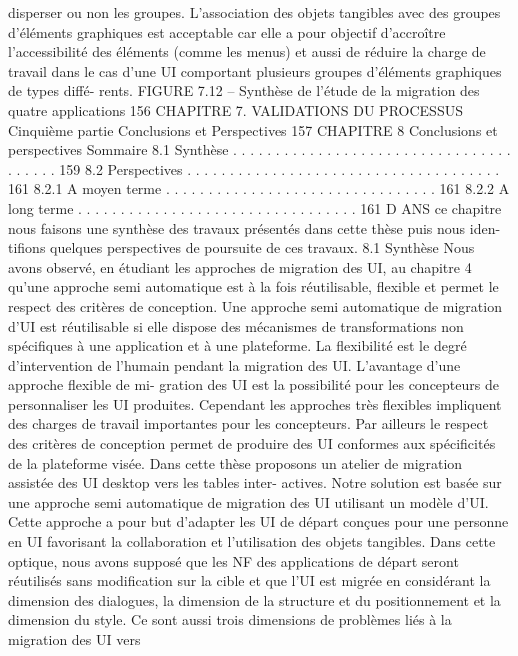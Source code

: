 \documentclass{article}
\begin{document}
disperser ou non les groupes.
L’association des objets tangibles avec des groupes d’éléments graphiques est acceptable car elle
a pour objectif d’accroître l’accessibilité des éléments (comme les menus) et aussi de réduire la charge
de travail dans le cas d’une UI comportant plusieurs groupes d’éléments graphiques de types diffé-
rents.
FIGURE 7.12 – Synthèse de l’étude de la migration des quatre applications
156
CHAPITRE 7. VALIDATIONS DU PROCESSUS
Cinquième partie
Conclusions et Perspectives
157
CHAPITRE 8
Conclusions et perspectives
Sommaire
8.1
Synthèse
. . . . . . . . . . . . . . . . . . . . . . . . . . . . . . . . . . . . . . . 159
8.2
Perspectives
. . . . . . . . . . . . . . . . . . . . . . . . . . . . . . . . . . . . . 161
8.2.1
A moyen terme . . . . . . . . . . . . . . . . . . . . . . . . . . . . . . . . 161
8.2.2
A long terme . . . . . . . . . . . . . . . . . . . . . . . . . . . . . . . . . 161
D
ANS ce chapitre nous faisons une synthèse des travaux présentés dans cette thèse puis nous iden-
tiﬁons quelques perspectives de poursuite de ces travaux.
8.1
Synthèse
Nous avons observé, en étudiant les approches de migration des UI, au chapitre 4 qu’une approche
semi automatique est à la fois réutilisable, ﬂexible et permet le respect des critères de conception.
Une approche semi automatique de migration d’UI est réutilisable si elle dispose des mécanismes
de transformations non spéciﬁques à une application et à une plateforme. La ﬂexibilité est le degré
d’intervention de l’humain pendant la migration des UI. L’avantage d’une approche ﬂexible de mi-
gration des UI est la possibilité pour les concepteurs de personnaliser les UI produites. Cependant
les approches très ﬂexibles impliquent des charges de travail importantes pour les concepteurs. Par
ailleurs le respect des critères de conception permet de produire des UI conformes aux spéciﬁcités
de la plateforme visée.
Dans cette thèse proposons un atelier de migration assistée des UI desktop vers les tables inter-
actives. Notre solution est basée sur une approche semi automatique de migration des UI utilisant un
modèle d’UI. Cette approche a pour but d’adapter les UI de départ conçues pour une personne en UI
favorisant la collaboration et l’utilisation des objets tangibles. Dans cette optique, nous avons supposé
que les NF des applications de départ seront réutilisés sans modiﬁcation sur la cible et que l’UI est
migrée en considérant la dimension des dialogues, la dimension de la structure et du positionnement
et la dimension du style. Ce sont aussi trois dimensions de problèmes liés à la migration des UI vers
\end{document}
